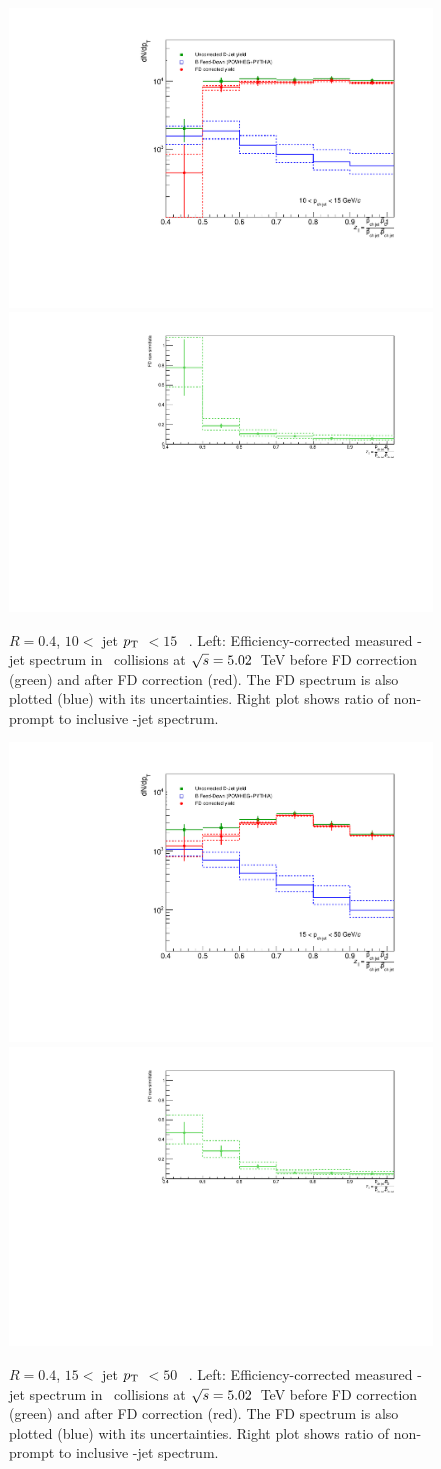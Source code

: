 \begin{figure}[bth]
\centering
\includegraphics[width=.47\textwidth]{pp_2sig/FD/R4/10_15/JetPtSpectra_FDsub}
\includegraphics[width=.522\textwidth]{pp_2sig/FD/R4/10_15/FDratio}
\caption{$R=0.4$, $10<$ jet $p_{\text T}$ $< 15$ \GeVc\ . Left: Efficiency-corrected measured \Dzero-jet spectrum in \pp\ collisions at $\sqrt{s}=5.02$~TeV before FD correction (green) and after FD correction (red). The FD spectrum is also plotted (blue) with its uncertainties. Right plot shows ratio of non-prompt to inclusive \Dzero-jet spectrum.}
\label{fig:ppFD_corr_Dzero_z10_15_R4}
\end{figure}

\begin{figure}[bth]
\centering
\includegraphics[width=.47\textwidth]{pp_2sig/FD/R4/15_50/JetPtSpectra_FDsub}
\includegraphics[width=.522\textwidth]{pp_2sig/FD/R4/15_50/FDratio}
\caption{$R=0.4$, $15<$ jet $p_{\text T}$ $<50$ \GeVc\ . Left: Efficiency-corrected measured \Dzero-jet spectrum in \pp\ collisions at $\sqrt{s}=5.02$~TeV before FD correction (green) and after FD correction (red). The FD spectrum is also plotted (blue) with its uncertainties. Right plot shows ratio of non-prompt to inclusive \Dzero-jet spectrum.}
\label{fig:ppFD_corr_Dzero_z15_50_R4}
\end{figure}


